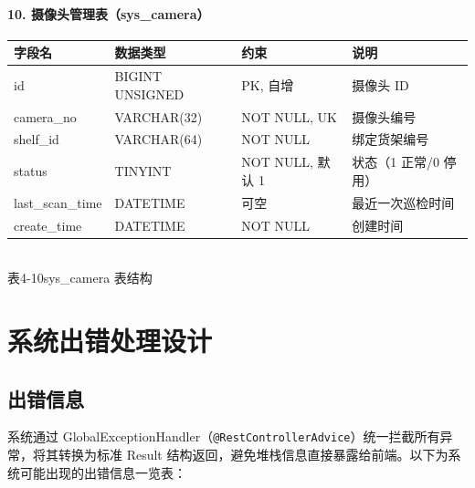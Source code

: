 \paragraph{10. 摄像头管理表（sys\_camera）}
\begin{center}
  \renewcommand{\arraystretch}{1.4}
  \begin{tabular}{|>{\centering\arraybackslash}m{2.5cm}|>{\centering\arraybackslash}m{3.2cm}|>{\centering\arraybackslash}m{4.4cm}|>{\centering\arraybackslash}m{3.5cm}|}
    \hline
    \textbf{字段名} & \textbf{数据类型}   & \textbf{约束}    & \textbf{说明}   \\ \hline
    id           & BIGINT UNSIGNED & PK, 自增         & 摄像头 ID        \\ \hline
    camera\_no   & VARCHAR(32)     & NOT NULL, UK   & 摄像头编号         \\ \hline
    shelf\_id    & VARCHAR(64)     & NOT NULL       & 绑定货架编号        \\ \hline
    status       & TINYINT         & NOT NULL, 默认 1 & 状态（1 正常/0 停用） \\ \hline
    last\_scan\_time & DATETIME    & 可空             & 最近一次巡检时间      \\ \hline
    create\_time & DATETIME        & NOT NULL       & 创建时间          \\ \hline
  \end{tabular}
  \\[0.3em]
  {表4-10\quad sys\_camera 表结构}
\end{center}

\section{系统出错处理设计}

\subsection{出错信息}

系统通过 GlobalExceptionHandler（\texttt{@RestControllerAdvice}）统一拦截所有异常，将其转换为标准 Result 结构返回，避免堆栈信息直接暴露给前端。以下为系统可能出现的出错信息一览表：


